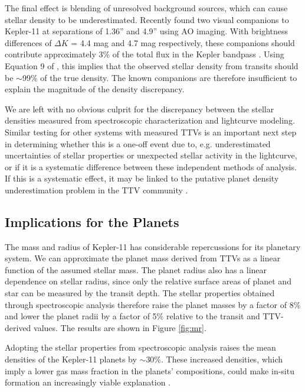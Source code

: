 \documentclass[oneside]{emulateapj}
\begin{document}
The final effect is blending of unresolved background sources, which can cause stellar density to be underestimated. Recently \citet{Wang2015} found two visual companions to Kepler-11 at separations of 1.36'' and 4.9'' using AO imaging. With brightness differences of $\Delta K$ = 4.4 mag and 4.7 mag respectively, these companions should contribute approximately 3\% of the total flux in the Kepler bandpass . Using Equation 9 of \citet{Kipping2014}, this implies that the observed stellar density from transits should be $\sim$99\% of the true density. The known companions are therefore insufficient to explain the magnitude of the density discrepancy.

We are left with no obvious culprit for the discrepancy between the stellar densities measured from spectroscopic characterization and lightcurve modeling. Similar testing for other systems with measured TTVs is an important next step in determining whether this is a one-off event due to, e.g. underestimated uncertainties of stellar properties or unexpected stellar activity in the lightcurve, or if it is a systematic difference between these independent methods of analysis. If this is a systematic effect, it may be linked to the putative planet density underestimation problem in the TTV community \citep{Weiss2014}.

\subsection{Implications for the Planets}

The mass and radius of Kepler-11 has considerable repercussions for its planetary system. We can approximate the planet mass derived from TTVs as a linear function of the assumed stellar mass. The planet radius also has a linear dependence on stellar radius, since only the relative surface areas of planet and star can be measured by the transit depth. The stellar properties obtained through spectroscopic analysis therefore raise the planet masses by a factor of 8\% and lower the planet radii by a factor of 5\% relative to the transit and TTV-derived values. The results are shown in Figure \ref{fig:mr}.

Adopting the stellar properties from spectroscopic analysis raises the mean densities of the Kepler-11 planets by $\sim$30\%. These increased densities, which imply a lower gas mass fraction in the planets' compositions, could make in-situ formation an increasingly viable explanation \citep[see e.g.][]{Lee2014}.
\end{document}
